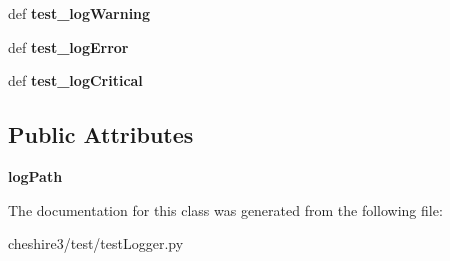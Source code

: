 \begin{DoxyCompactItemize}
\item 
\hypertarget{classcheshire3_1_1test_1_1test_logger_1_1_simple_logger_test_case_abbb34340962a1380dde6486dd2b12649}{def {\bfseries test\-\_\-log\-Warning}}\label{classcheshire3_1_1test_1_1test_logger_1_1_simple_logger_test_case_abbb34340962a1380dde6486dd2b12649}

\item 
\hypertarget{classcheshire3_1_1test_1_1test_logger_1_1_simple_logger_test_case_aba52a243c54feb9aee14ec3dd247e8d2}{def {\bfseries test\-\_\-log\-Error}}\label{classcheshire3_1_1test_1_1test_logger_1_1_simple_logger_test_case_aba52a243c54feb9aee14ec3dd247e8d2}

\item 
\hypertarget{classcheshire3_1_1test_1_1test_logger_1_1_simple_logger_test_case_aaf99986b539011726c581fdf63281219}{def {\bfseries test\-\_\-log\-Critical}}\label{classcheshire3_1_1test_1_1test_logger_1_1_simple_logger_test_case_aaf99986b539011726c581fdf63281219}

\end{DoxyCompactItemize}
\subsection*{Public Attributes}
\begin{DoxyCompactItemize}
\item 
\hypertarget{classcheshire3_1_1test_1_1test_logger_1_1_simple_logger_test_case_acb52db5522f67f80f50bba5c79fcdcbb}{{\bfseries log\-Path}}\label{classcheshire3_1_1test_1_1test_logger_1_1_simple_logger_test_case_acb52db5522f67f80f50bba5c79fcdcbb}

\end{DoxyCompactItemize}


The documentation for this class was generated from the following file\-:\begin{DoxyCompactItemize}
\item 
cheshire3/test/test\-Logger.\-py\end{DoxyCompactItemize}
